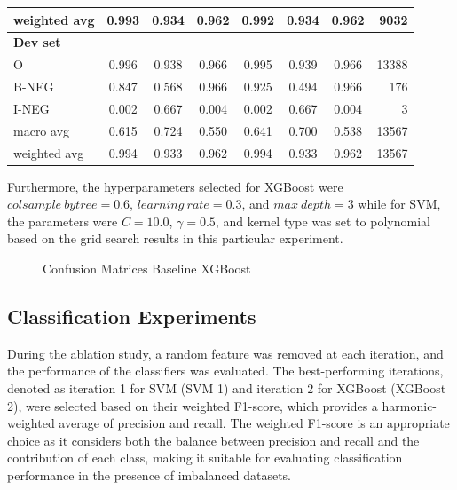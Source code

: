 \begin{table}[!ht]
\begin{tabular}{lccc|cccr}
weighted avg       &  0.993 &  0.934 &  0.962 & 0.992 & 0.934 & 0.962 & 9032 \\
\hline
\textbf{Dev set}   &        &        &        &       &       & &   \\
O                  &  0.996 &  0.938 &  0.966 & 0.995 & 0.939 & 0.966 & 13388 \\
B-NEG              &  0.847 &  0.568 &  0.966 & 0.925 & 0.494 & 0.966 & 176 \\
I-NEG              &  0.002 &  0.667 &  0.004 & 0.002 & 0.667 & 0.004 & 3 \\
macro avg          &  0.615 &  0.724 &  0.550 & 0.641 & 0.700 & 0.538 & 13567 \\
weighted avg       &  0.994 &  0.933 &  0.962 & 0.994 & 0.933 & 0.962 & 13567 \\
\hline
\end{tabular}
\end{table}
Furthermore, the hyperparameters selected for XGBoost were $colsample \ bytree = 0.6$, $learning \ rate = 0.3$, and $max \ depth = 3$ while for SVM, the parameters were $C = 10.0$, $\gamma = 0.5$, and kernel type was set to polynomial based on the grid search results in this particular experiment.

\begin{figure}[!h]
\centering
  \caption{Confusion Matrices Baseline XGBoost}
  \label{fig:base_line_xgb}
\end{figure}
\subsection{Classification Experiments}

During the ablation study, a random feature was removed at each iteration, and the performance of the classifiers was evaluated. The best-performing iterations, denoted as iteration 1 for SVM (SVM 1) and iteration 2 for XGBoost (XGBoost 2), were selected based on their weighted F1-score, which provides a harmonic-weighted average of precision and recall. The weighted F1-score is an appropriate choice as it considers both the balance between precision and recall and the contribution of each class, making it suitable for evaluating classification performance in the presence of imbalanced datasets.

